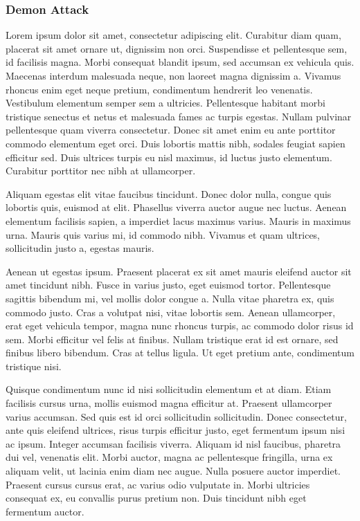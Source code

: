 \subsubsection{Demon Attack}
\label{subsec:botsbasicos:da}
Lorem ipsum dolor sit amet, consectetur adipiscing elit. Curabitur diam quam, placerat sit amet ornare ut, dignissim non orci. Suspendisse et pellentesque sem, id facilisis magna. Morbi consequat blandit ipsum, sed accumsan ex vehicula quis. Maecenas interdum malesuada neque, non laoreet magna dignissim a. Vivamus rhoncus enim eget neque pretium, condimentum hendrerit leo venenatis. Vestibulum elementum semper sem a ultricies. Pellentesque habitant morbi tristique senectus et netus et malesuada fames ac turpis egestas. Nullam pulvinar pellentesque quam viverra consectetur. Donec sit amet enim eu ante porttitor commodo elementum eget orci. Duis lobortis mattis nibh, sodales feugiat sapien efficitur sed. Duis ultrices turpis eu nisl maximus, id luctus justo elementum. Curabitur porttitor nec nibh at ullamcorper.

Aliquam egestas elit vitae faucibus tincidunt. Donec dolor nulla, congue quis lobortis quis, euismod at elit. Phasellus viverra auctor augue nec luctus. Aenean elementum facilisis sapien, a imperdiet lacus maximus varius. Mauris in maximus urna. Mauris quis varius mi, id commodo nibh. Vivamus et quam ultrices, sollicitudin justo a, egestas mauris.

Aenean ut egestas ipsum. Praesent placerat ex sit amet mauris eleifend auctor sit amet tincidunt nibh. Fusce in varius justo, eget euismod tortor. Pellentesque sagittis bibendum mi, vel mollis dolor congue a. Nulla vitae pharetra ex, quis commodo justo. Cras a volutpat nisi, vitae lobortis sem. Aenean ullamcorper, erat eget vehicula tempor, magna nunc rhoncus turpis, ac commodo dolor risus id sem. Morbi efficitur vel felis at finibus. Nullam tristique erat id est ornare, sed finibus libero bibendum. Cras at tellus ligula. Ut eget pretium ante, condimentum tristique nisi.

Quisque condimentum nunc id nisi sollicitudin elementum et at diam. Etiam facilisis cursus urna, mollis euismod magna efficitur at. Praesent ullamcorper varius accumsan. Sed quis est id orci sollicitudin sollicitudin. Donec consectetur, ante quis eleifend ultrices, risus turpis efficitur justo, eget fermentum ipsum nisi ac ipsum. Integer accumsan facilisis viverra. Aliquam id nisl faucibus, pharetra dui vel, venenatis elit. Morbi auctor, magna ac pellentesque fringilla, urna ex aliquam velit, ut lacinia enim diam nec augue. Nulla posuere auctor imperdiet. Praesent cursus cursus erat, ac varius odio vulputate in. Morbi ultricies consequat ex, eu convallis purus pretium non. Duis tincidunt nibh eget fermentum auctor.



